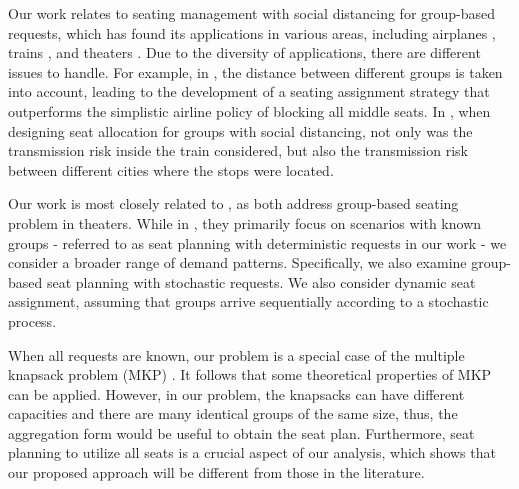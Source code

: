 Our work relates to seating management with social distancing for group-based requests, which has found its applications in various areas, including airplanes \citep{salari2022social}, trains \citep{haque2023social}, and theaters \citep{blom2022filling}. Due to the diversity of applications, there are different issues to handle. For example, in \cite{salari2022social}, the distance between different groups is taken into account, leading to the development of a seating assignment strategy that outperforms the simplistic airline policy of blocking all middle seats. In \citet{haque2023social}, when designing seat allocation for groups with social distancing, not only was the transmission risk inside the train considered, but also the transmission risk between different cities where the stops were located.


Our work is most closely related to \citet{blom2022filling}, as both address group-based seating problem in theaters. While in \citet{blom2022filling}, they primarily focus on scenarios with known groups - referred to as seat planning with deterministic requests in our work - we consider a broader range of demand patterns. Specifically, we also examine group-based seat planning with stochastic requests. We also consider dynamic seat assignment, assuming that groups arrive sequentially according to a stochastic process. 


When all requests are known, our problem is a special case of the multiple knapsack problem (MKP) \citep{pisinger1999exact}. It follows that some theoretical properties of MKP can be applied. However, in our problem, the knapsacks can have different capacities and there are many identical groups of the same size, thus, the aggregation form would be useful to obtain the seat plan. Furthermore, seat planning to utilize all seats is a crucial aspect of our analysis, which shows that our proposed approach will be different from those in the literature. 


